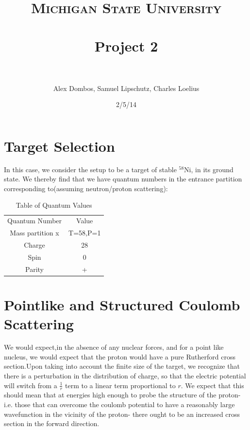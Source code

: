 \documentclass[paper=a4, fontsize=11pt]{scrartcl} %
\title{	
\normalfont \normalsize 
\textsc{Michigan State University} \\ [25pt] %
\horrule{0.5pt} \\[0.4cm] %
\huge  Project 2 \\ %
\horrule{2pt} \\[0.5cm] %
}
\author{Alex Dombos, Samuel Lipschutz, Charles Loelius} %
\date{\normalsize 2/5/14} %
\numberwithin{equation}{section} %
\numberwithin{figure}{section} %
\numberwithin{table}{section} %
\begin{document}
\maketitle %


\section{Target Selection}

In this case, we consider the setup to be a target of stable $^{58}$Ni, in its ground state. We thereby find that we have quantum numbers in the entrance partition corresponding to(assuming neutron/proton scattering):\\
\begin{center}
\begin{table}[h!]
\captionsetup{font=large}
\caption{Table of Quantum Values}
\centering
\vspace{3 mm}
\begin{tabular}{|c|c|}

Quantum Number & Value \\
Mass partition x & T=58,P=1\\
Charge & 28 \\
Spin & 0\\
Parity & +


\end{tabular}
\end{table}
\end{center}


\section{Pointlike and Structured Coulomb Scattering}

We would expect,in the absence of any nuclear forces, and for a point like nucleus, we would expect that the proton would have a pure Rutherford cross section.Upon taking into account the finite size of the target, we recognize that there is a perturbation in the distribution of charge, so that the electric potential will switch from a $\frac{1}{r}$ term to a linear term proportional to $r$. We expect that this should mean that at energies high enough to probe the structure of the proton-i.e. those that can overcome the coulomb potential to have a reasonably large wavefunction in the vicinity of the proton- there ought to be an increased cross section in the forward direction. \\
\end{document}
